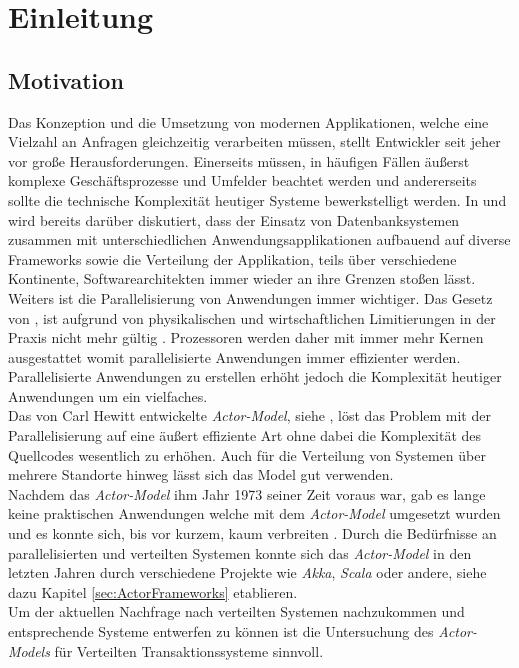 \chapter{Einleitung}\label{cha:introduction}
\section{Motivation}\label{sec:introduction:motivation}
Das Konzeption und die Umsetzung von modernen Applikationen, welche eine Vielzahl an Anfragen gleichzeitig verarbeiten müssen, stellt Entwickler seit jeher vor große Herausforderungen. Einerseits müssen, in häufigen Fällen äußerst komplexe Geschäftsprozesse und Umfelder beachtet werden und andererseits sollte die technische Komplexität heutiger Systeme bewerkstelligt werden. In \cite{Vernon2015ReactiveAkka} und \cite{Evans2004Domain-drivenSoftware} wird bereits darüber diskutiert, dass der Einsatz von Datenbanksystemen zusammen mit unterschiedlichen Anwendungsapplikationen aufbauend auf diverse Frameworks sowie die Verteilung der Applikation, teils über verschiedene Kontinente, Softwarearchitekten immer wieder an ihre Grenzen stoßen lässt. \\ 
Weiters ist die Parallelisierung von Anwendungen immer wichtiger. Das Gesetz von \cite{moore1965moore}, ist aufgrund von physikalischen und wirtschaftlichen Limitierungen in der Praxis nicht mehr gültig \citep{mann2000end}. Prozessoren werden daher mit immer mehr Kernen ausgestattet womit parallelisierte Anwendungen immer effizienter werden. Parallelisierte Anwendungen zu erstellen erhöht jedoch die Komplexität heutiger Anwendungen um ein vielfaches. \\
Das von Carl Hewitt entwickelte \textit{Actor-Model}, siehe \cite{Hewitt1973AIntelligence}, löst das Problem mit der Parallelisierung auf eine äußert effiziente Art ohne dabei die Komplexität des Quellcodes wesentlich zu erhöhen. Auch für die Verteilung von Systemen über mehrere Standorte hinweg lässt sich das Model gut verwenden. \\
Nachdem das \textit{Actor-Model} ihm Jahr 1973 seiner Zeit voraus war, gab es lange keine praktischen Anwendungen welche mit dem \textit{Actor-Model} umgesetzt wurden und es konnte sich, bis vor kurzem, kaum verbreiten \citep{mackay1997has}. Durch die Bedürfnisse an parallelisierten und verteilten Systemen konnte sich das \textit{Actor-Model} in den letzten Jahren durch verschiedene Projekte wie \textit{Akka}, \textit{Scala} oder andere, siehe dazu Kapitel \ref{sec:ActorFrameworks} etablieren. \\
Um der aktuellen Nachfrage nach verteilten Systemen nachzukommen und entsprechende Systeme entwerfen zu können ist die Untersuchung des \textit{Actor-Models} für Verteilten Transaktionssysteme sinnvoll.


